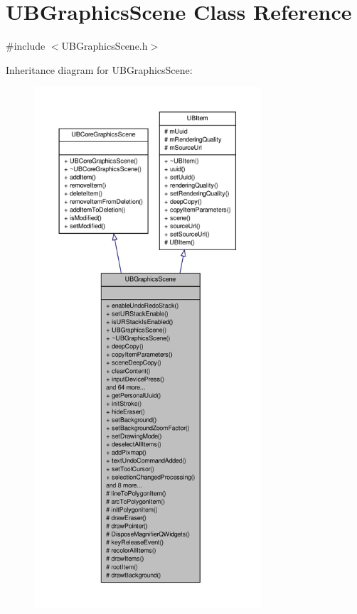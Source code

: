 \hypertarget{class_u_b_graphics_scene}{\section{U\-B\-Graphics\-Scene Class Reference}
\label{dc/db2/class_u_b_graphics_scene}
}


{\ttfamily \#include $<$U\-B\-Graphics\-Scene.\-h$>$}



Inheritance diagram for U\-B\-Graphics\-Scene\-:
\nopagebreak
\begin{figure}[H]
\begin{center}
\leavevmode
\includegraphics[height=550pt]{d4/df7/class_u_b_graphics_scene__inherit__graph}
\end{center}
\end{figure}


